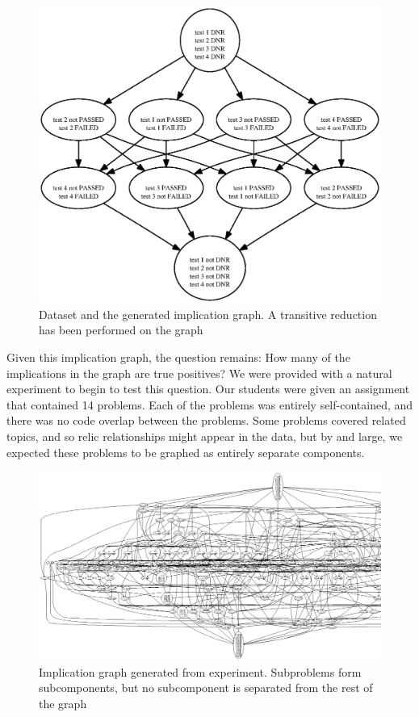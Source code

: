 \documentclass[11pt,twoside]{article}
\theoremstyle{definition}
\begin{document}
\begin{figure}

\includegraphics[width=\textwidth]{toyimpl.ps}
\caption{Dataset and the generated implication graph. A transitive reduction has been performed on the graph}
\end{figure}

Given this implication graph, the question remains: How many of the implications in the graph are true positives? We were provided with a natural experiment to begin to test this question. Our students were given an assignment that contained 14 problems. Each of the problems was entirely self-contained, and there was no code overlap between the problems. Some problems covered related topics, and so relic relationships might appear in the data, but by and large, we expected these problems to be graphed as entirely separate components.

\begin{figure}
\includegraphics[width=\textwidth]{div.ps}
\caption{Implication graph generated from experiment. Subproblems form subcomponents, but no subcomponent is separated from the rest of the graph}
\end{figure}
\end{document}

